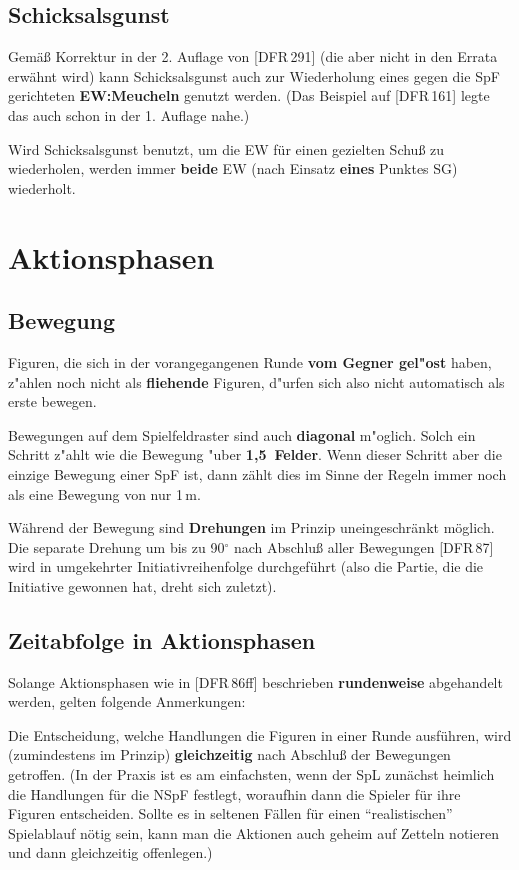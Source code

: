 \documentclass[10pt,a4paper,germanpar]{article}
\begin{document}
\subsection{Schicksalsgunst}

Gemäß Korrektur in der 2. Auflage von [DFR\,291] (die aber nicht in
den Errata erwähnt wird) kann Schicksalsgunst auch zur Wiederholung
eines gegen die SpF gerichteten \textbf{EW:Meucheln} genutzt werden.
(Das Beispiel auf [DFR\,161] legte das auch schon in der 1. Auflage
nahe.)

Wird Schicksalsgunst benutzt, um die EW für einen gezielten Schuß zu
wiederholen, werden immer \textbf{beide} EW (nach Einsatz
\textbf{eines} Punktes SG) wiederholt.

\section{Aktionsphasen}

\subsection{Bewegung}

Figuren, die sich in der vorangegangenen Runde \textbf{vom Gegner gel"ost} 
haben, z"ahlen noch nicht als \textbf{fliehende} Figuren, d"urfen sich 
also nicht automatisch als erste bewegen.

Bewegungen auf dem Spielfeldraster sind auch \textbf{diagonal}
m"oglich. Solch ein Schritt z"ahlt wie die Bewegung "uber
\textbf{1,5~Felder}. Wenn dieser Schritt aber die einzige Bewegung
einer SpF ist, dann zählt dies im Sinne der Regeln immer noch als eine
Bewegung von nur 1\,m.

Während der Bewegung sind \textbf{Drehungen} im Prinzip
uneingeschränkt möglich. Die separate Drehung um bis zu 90$^\circ$
nach Abschluß aller Bewegungen [DFR\,87] wird in umgekehrter
Initiativreihenfolge durchgeführt (also die Partie, die die Initiative
gewonnen hat, dreht sich zuletzt).

\subsection{Zeitabfolge in Aktionsphasen}
\label{timing}

Solange Aktionsphasen wie in [DFR\,86ff] beschrieben \textbf{rundenweise}
abgehandelt werden, gelten folgende Anmerkungen:

Die Entscheidung, welche Handlungen die Figuren in einer Runde
ausführen, wird (zumindestens im Prinzip) \textbf{gleichzeitig} nach
Abschluß der Bewegungen getroffen. (In der Praxis ist es am
einfachsten, wenn der SpL zunächst heimlich die Handlungen für
die NSpF festlegt, woraufhin dann die Spieler für ihre Figuren
entscheiden. Sollte es in seltenen Fällen für einen "`realistischen"'
Spielablauf nötig sein, kann man die Aktionen auch geheim auf Zetteln
notieren und dann gleichzeitig offenlegen.)
\end{document}

